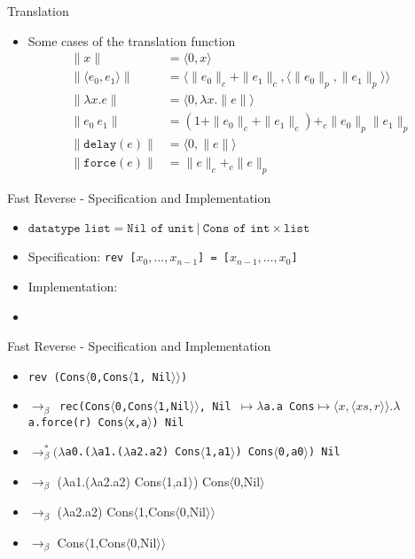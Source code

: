 \documentclass[pdf]{beamer}
\newcommand{\T}[1]{\texttt{#1}}
\newcommand{\LP}{\langle}
\newcommand{\RP}{\rangle}
\begin{document}
\begin{frame}{Translation}
  \begin{itemize}
    \item[] Some cases of the translation function
      \begin{align*}
        \|x\| &= \LP 0,x \RP \\
        \|\LP e_0,e_1 \RP\| &= \LP \|e_0\|_c + \|e_1\|_c, \LP \|e_0\|_p,\|e_1\|_p\RP\RP \\
        \|\lambda x.e\| &= \LP 0, \lambda x.\|e\|\RP \\
        \|e_0\ e_1\| &= (1 + \|e_0\|_c + \|e_1\|_c) +_c \|e_0\|_p \|e_1\|_p \\
        \|\T{delay}(e)\| &= \LP 0,\|e\| \RP \\
        \|\T{force}(e)\| &= \|e\|_c +_c \|e\|_p
      \end{align*}
  \end{itemize}
\end{frame}


\begin{frame}{Fast Reverse - Specification and Implementation}
  \begin{itemize}
    \item
        $\T{datatype list} = \T{Nil of unit}\ |\ \T{Cons of int} \times \T{list}$
    \item
      Specification: \T{rev [$x_0,\dots,x_{n-1}$] = [$x_{n-1},\dots,x_0$]}
    \item
      Implementation:
      \usebox{\codebox}
    \item[]
      \lstfastreverse
  \end{itemize}
\end{frame}

\begin{frame}{Fast Reverse - Specification and Implementation}
  \begin{itemize}
    \item
      \T{rev (Cons$\LP$0,Cons$\LP$1, Nil$\RP\RP$)}
    \item
    \T{$\to_\beta$
      rec(Cons$\LP$0,Cons$\LP$1,Nil$\RP\RP$,
          Nil $\mapsto\lambda$a.a
          Cons$\mapsto \LP x,\LP xs,r\RP\RP.\lambda$a.force(r) Cons$\LP$x,a$\RP$) Nil}
    \item
      \T{$\to^*_\beta (\lambda$a0.($\lambda$a1.($\lambda$a2.a2) Cons$\LP$1,a1$\RP$) Cons$\LP$0,a0$\RP$) Nil}
    \item
      $\to_\beta$ ($\lambda$a1.($\lambda$a2.a2) Cons$\LP$1,a1$\RP$) Cons$\LP$0,Nil$\RP$
    \item
      $\to_\beta$ ($\lambda$a2.a2) Cons$\LP$1,Cons$\LP$0,Nil$\RP\RP$
    \item
      $\to_\beta$ Cons$\LP$1,Cons$\LP$0,Nil$\RP\RP$
  \end{itemize}
\end{frame}
\end{document}
